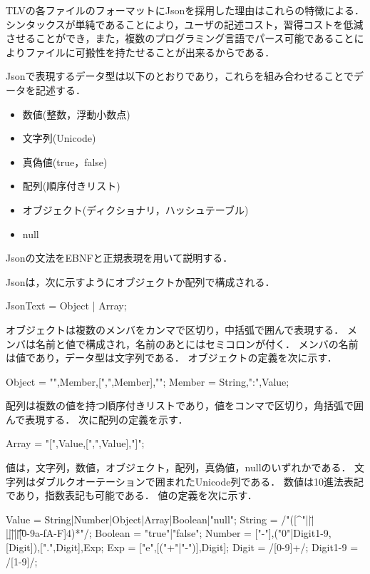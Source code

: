 TLVの各ファイルのフォーマットにJsonを採用した理由はこれらの特徴による．
シンタックスが単純であることにより，ユーザの記述コスト，習得コストを低減させることができ，また，複数のプログラミング言語でパース可能であることによりファイルに可搬性を持たせることが出来るからである．

Jsonで表現するデータ型は以下のとおりであり，これらを組み合わせることでデータを記述する．
\begin{itemize}
\setlength{\itemsep}{0.5\itemsep}
\item 数値(整数，浮動小数点)
\item 文字列(Unicode)
\item 真偽値(true，false)
\item 配列(順序付きリスト)
\item オブジェクト(ディクショナリ，ハッシュテーブル)
\item null
\end{itemize}

Jsonの文法をEBNFと正規表現を用いて説明する．

Jsonは，次に示すようにオブジェクトか配列で構成される．

\begin{EBNF}
JsonText = Object | Array;
\end{EBNF}

オブジェクトは複数のメンバをカンマで区切り，中括弧で囲んで表現する．
メンバは名前と値で構成され，名前のあとにはセミコロンが付く．
メンバの名前は値であり，データ型は文字列である．
オブジェクトの定義を次に示す．

\begin{EBNF}
Object = "{",Member,[{",",Member}],"}";
Member = String,":",Value;
\end{EBNF}

配列は複数の値を持つ順序付きリストであり，値をコンマで区切り，角括弧で囲んで表現する．
次に配列の定義を示す．

\begin{EBNF}
Array = "[",Value,[{",",Value}],"]";
\end{EBNF}

値は，文字列，数値，オブジェクト，配列，真偽値，nullのいずれかである．
文字列はダブルクオーテーションで囲まれたUnicode列である．
数値は10進法表記であり，指数表記も可能である．
値の定義を次に示す．

\begin{EBNF}
Value = String|Number|Object|Array|Boolean|"null";
String = /"([^"\]|\n|\"|\\|\b|\f|\r|\t|\u[0-9a-fA-F]{4})*"/;
Boolean = "true"|"false";
Number = ["-"],("0"|Digit1-9,[Digit]),[".",Digit],Exp;
Exp = ["e",[("+"|"-")],Digit];
Digit = /[0-9]+/;
Digit1-9 = /[1-9]/;
\end{EBNF}

